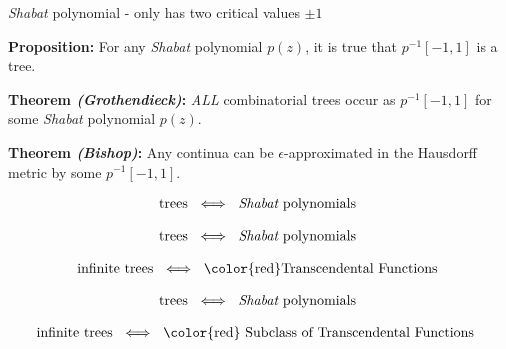 \documentclass{beamer}
\begin{document}
\begin{frame}

{\it Shabat} polynomial - only has two critical values $\pm 1$

\vspace{5mm}

{\bf Proposition:} For any {\it Shabat} polynomial $p(z)$, it is true that $p^{-1}[-1,1]$ is a tree.

\vspace{5mm} 

{\bf Theorem {\it (Grothendieck)}:} {\it ALL} combinatorial trees occur as $p^{-1}[-1,1]$ for some {\it Shabat} polynomial $p(z)$.

\vspace{5mm}

{\bf Theorem {\it (Bishop)}:} Any {\color{red} continua} can be $\epsilon$-approximated in the {\color{red} Hausdorff metric} by some $p^{-1}[-1,1]$. 

\end{frame}




\begin{frame}

\begin{align*} \text{trees }  \iff \text{ {\it Shabat} polynomials } \end{align*}

\end{frame}


\begin{frame}

\begin{align*} \text{trees }  \iff \text{ {\it Shabat} polynomials } \end{align*}

\vspace{5mm}

\begin{align*} \text{infinite trees }  \iff \text{ {\color{red}Transcendental Functions }} \end{align*}

\end{frame}


\begin{frame}

\begin{align*} \text{trees }  \iff \text{ {\it Shabat} polynomials } \end{align*}

\vspace{5mm}

\begin{align*} \text{infinite trees }  \iff \text{ {\color{red} Subclass of Transcendental Functions } } \end{align*}

\end{frame}
\end{document}

